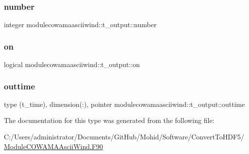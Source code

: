 \subsubsection{\texorpdfstring{number}{number}}
{\footnotesize\ttfamily integer modulecowamaasciiwind\+::t\+\_\+output\+::number\hspace{0.3cm}{\ttfamily [private]}}

\mbox{\label{structmodulecowamaasciiwind_1_1t__output_a1e96a07771ddaf347f3d30504e4c9f88}} 
\subsubsection{\texorpdfstring{on}{on}}
{\footnotesize\ttfamily logical modulecowamaasciiwind\+::t\+\_\+output\+::on\hspace{0.3cm}{\ttfamily [private]}}

\mbox{\label{structmodulecowamaasciiwind_1_1t__output_a685e6b224e4609ae6ec1a438276fc467}} 
\subsubsection{\texorpdfstring{outtime}{outtime}}
{\footnotesize\ttfamily type (t\+\_\+time), dimension(\+:), pointer modulecowamaasciiwind\+::t\+\_\+output\+::outtime\hspace{0.3cm}{\ttfamily [private]}}



The documentation for this type was generated from the following file\+:\begin{DoxyCompactItemize}
\item 
C\+:/\+Users/administrator/\+Documents/\+Git\+Hub/\+Mohid/\+Software/\+Convert\+To\+H\+D\+F5/\mbox{\hyperlink{_module_c_o_w_a_m_a_ascii_wind_8_f90}{Module\+C\+O\+W\+A\+M\+A\+Ascii\+Wind.\+F90}}\end{DoxyCompactItemize}
